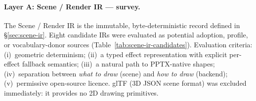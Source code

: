 \paragraph{Layer A: Scene / Render IR --- survey.}
The Scene / Render IR is the immutable, byte-deterministic record defined in
\S\ref{sec:scene-ir}.
Eight candidate IRs were evaluated as potential adoption, profile, or
vocabulary-donor sources (Table~\ref{tab:scene-ir-candidates}).
Evaluation criteria: (i)~geometric determinism; (ii)~a typed effect
representation with explicit per-effect fallback semantics;
(iii)~a natural path to PPTX-native shapes; (iv)~separation between
\emph{what to draw} (scene) and \emph{how to draw} (backend);
(v)~permissive open-source licence.
glTF (3D JSON scene format) was excluded immediately: it provides no 2D
drawing primitives.

